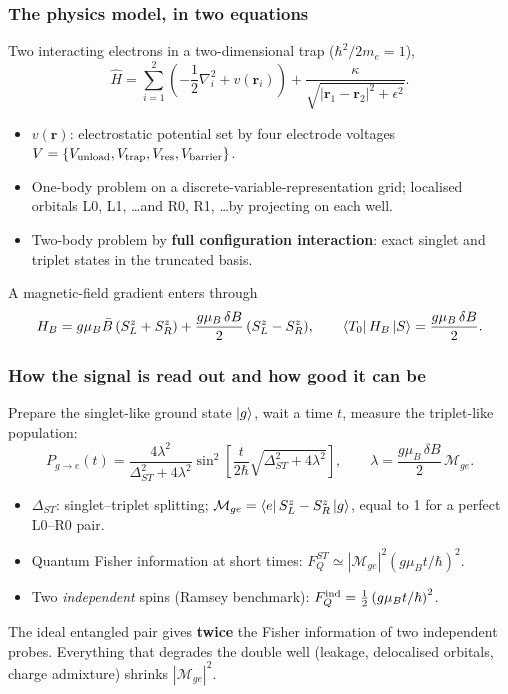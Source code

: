 \documentclass{beamer}
\begin{document}
\begin{frame}
\frametitle{The physics model, in two equations}
Two interacting electrons in a two-dimensional trap ($\hbar^2/2m_e=1$),
\[
\hat{H} = \sum_{i=1}^{2} \left( -\frac{1}{2}\nabla_i^2 + v(\bm{r}_i) \right) + \frac{\kappa}{\sqrt{|\bm{r}_1-\bm{r}_2|^2+\epsilon^2}} .
\]
\begin{itemize}
\item $v(\bm{r})$: electrostatic potential set by four electrode voltages $V=\{V_{\rm unload},V_{\rm trap},V_{\rm res},V_{\rm barrier}\}$.
\item One-body problem on a discrete-variable-representation grid; localised orbitals L0, L1, \dots and R0, R1, \dots by projecting on each well.
\item Two-body problem by \textbf{full configuration interaction}: exact singlet and triplet states in the truncated basis.
\end{itemize}
A magnetic-field gradient enters through
\[
H_B = g\mu_B \bar{B}\,(S^z_L+S^z_R) + \frac{g\mu_B\,\delta B}{2}\,(S^z_L-S^z_R),\qquad
\bra{T_0}H_B\ket{S}=\frac{g\mu_B\,\delta B}{2}.
\]
\end{frame}

\begin{frame}
\frametitle{How the signal is read out and how good it can be}
Prepare the singlet-like ground state $\ket{g}$, wait a time $t$, measure the triplet-like population:
\[
P_{g\to e}(t)=\frac{4\lambda^2}{\Delta_{ST}^2+4\lambda^2}\sin^2\!\left[\frac{t}{2\hbar}\sqrt{\Delta_{ST}^2+4\lambda^2}\right],\qquad
\lambda=\frac{g\mu_B\,\delta B}{2}\,\mathcal{M}_{ge}.
\]
\begin{itemize}
\item $\Delta_{ST}$: singlet--triplet splitting; $\mathcal{M}_{ge}=\bra{e}S^z_L-S^z_R\ket{g}$, equal to 1 for a perfect L0--R0 pair.
\item Quantum Fisher information at short times: $F_Q^{ST}\simeq |\mathcal{M}_{ge}|^2 \left(g\mu_B t/\hbar\right)^2$.
\item Two \emph{independent} spins (Ramsey benchmark): $F_Q^{\rm ind}=\tfrac12\left(g\mu_B t/\hbar\right)^2$.
\end{itemize}
\begin{block}{}
The ideal entangled pair gives \textbf{twice} the Fisher information of two independent probes. Everything that degrades the double well (leakage, delocalised orbitals, charge admixture) shrinks $|\mathcal{M}_{ge}|^2$.
\end{block}
\end{frame}
\end{document}

